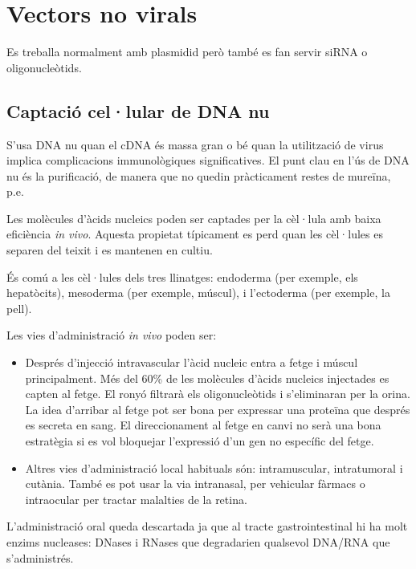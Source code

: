 \section{Vectors no virals}
\label{sec:vectors-no-virals}

Es treballa normalment amb plasmidid però també es fan servir siRNA o oligonucleòtids.

\subsection{Captació cel·lular de DNA nu}
\label{sec:capt-cel.l-de}

S'usa DNA nu quan el cDNA és massa gran o bé quan la utilització de virus implica complicacions immunològiques significatives. El punt clau en l'ús de DNA nu és la purificació, de manera que no quedin pràcticament restes de mureïna, p.e.

Les molècules d'àcids nucleics poden ser captades per la cèl·lula amb baixa eficiència \textit{in vivo}. Aquesta propietat típicament es perd quan les cèl·lules es separen del teixit i es mantenen en cultiu.

És comú a les cèl·lules dels tres llinatges: endoderma (per exemple, els hepatòcits), mesoderma (per exemple, múscul), i l'ectoderma (per exemple, la pell).

Les vies d'administració \textit{in vivo} poden ser:
\begin{itemize}
\item Després d'injecció intravascular l'àcid nucleic entra a fetge i múscul principalment. Més del 60\% de les molècules d'àcids nucleics injectades es capten al fetge. El ronyó filtrarà els oligonucleòtids i s'eliminaran per la orina. La idea d'arribar al fetge pot ser bona per expressar una proteïna que després es secreta en sang. El direccionament al fetge en canvi no serà una bona estratègia si es vol bloquejar l'expressió d'un gen no específic del fetge.

\item Altres vies d'administració local habituals són: intramuscular, intratumoral i cutània. També es pot usar la via intranasal, per vehicular fàrmacs o intraocular per tractar malalties de la retina.
\end{itemize}

L'administració oral queda descartada ja que al tracte gastrointestinal hi ha molt enzims nucleases: DNases i RNases que degradarien qualsevol DNA/RNA que s'administrés.

